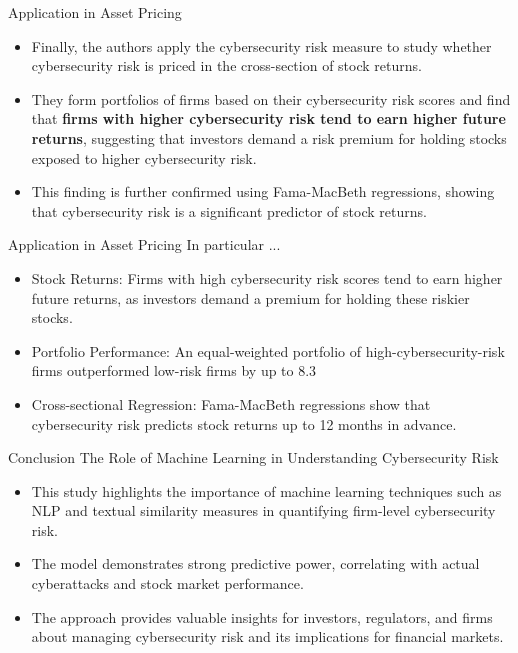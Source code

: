 \documentclass[11pt]{beamer}
\begin{document}
\begin{frame}{Application in Asset Pricing}
	\begin{itemize}
		\item Finally, the authors apply the cybersecurity risk measure to study whether cybersecurity risk is priced in the cross-section of stock returns.

		\item They form portfolios of firms based on their cybersecurity risk scores and find that \textbf{firms with higher cybersecurity risk tend to earn higher future returns}, suggesting that investors demand a risk premium for holding stocks exposed to higher cybersecurity risk.

		\item This finding is further confirmed using Fama-MacBeth regressions, showing that cybersecurity risk is a significant predictor of stock returns.
	\end{itemize}
\end{frame}
\begin{frame}{Application in Asset Pricing}
In particular ...

	\begin{itemize}
		\item Stock Returns: Firms with high cybersecurity risk scores tend to earn higher future returns, as investors demand a premium for holding these riskier stocks.

		\item Portfolio Performance: An equal-weighted portfolio of high-cybersecurity-risk firms outperformed low-risk firms by up to 8.3%

		\item Cross-sectional Regression: Fama-MacBeth regressions show that cybersecurity risk predicts stock returns up to 12 months in advance.

	\end{itemize}
\end{frame}
\begin{frame}{Conclusion}
The Role of Machine Learning in Understanding Cybersecurity Risk

	\begin{itemize}
		\item This study highlights the importance of machine learning techniques such as NLP and textual similarity measures in quantifying firm-level cybersecurity risk.

		\item The model demonstrates strong predictive power, correlating with actual cyberattacks and stock market performance.

		\item The approach provides valuable insights for investors, regulators, and firms about managing cybersecurity risk and its implications for financial markets.

	\end{itemize}
\end{frame}
\end{document}
